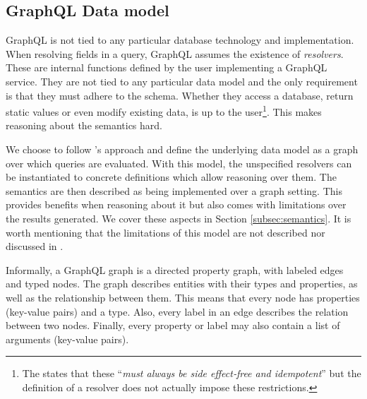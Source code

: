 \subsection{GraphQL Data model}

GraphQL is not tied to any particular database technology and implementation. When resolving fields in a query, GraphQL assumes the existence of \textit{resolvers}. These are internal functions defined by the user implementing a GraphQL service. They are not tied to any particular data model and the only requirement is that they must adhere to the schema. Whether they access a database, return static values or even modify existing data, is up to the user\footnote{The \spec{} states that these ``\textit{must always be side effect‐free and idempotent}'' but the definition of a resolver does not actually impose these restrictions.}. This makes reasoning about the semantics hard.

We choose to follow \HP{}'s approach and define the underlying data model as a graph over which queries are evaluated. With this model, the unspecified resolvers can be instantiated to concrete definitions which allow reasoning over them. The semantics are then described as being implemented over a graph setting. This provides benefits when reasoning about it but also comes with limitations over the results generated. We cover these aspects in Section \ref{subsec:semantics}. It is worth mentioning that the limitations of this model are not described nor discussed in \HP{}.

Informally, a GraphQL graph is a directed property graph, with labeled edges and typed nodes. The graph describes entities with their types and properties, as well as the relationship between them. This means that every node has properties (key-value pairs) and a type. Also, every label in an edge describes the relation between two nodes. Finally, every property or label may also contain a list of arguments (key-value pairs).

